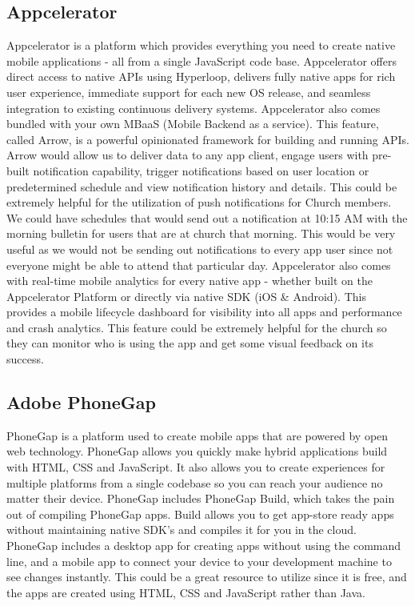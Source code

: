 \documentclass[letterpaper,10pt,draftclsnofoot,onecolumn,titlepage]{IEEEtran}
\begin{document}
		\subsection{Appcelerator}
			Appcelerator is a platform which provides everything you need to create native mobile applications - all from a single JavaScript code base. \cite{Appcelerator}
			Appcelerator offers direct access to native APIs using Hyperloop, delivers fully native apps for rich user experience, immediate support for each new OS release, and seamless integration to existing continuous delivery systems.
			Appcelerator also comes bundled with your own MBaaS (Mobile Backend as a service).
			This feature, called Arrow, is a powerful opinionated framework for building and running APIs.
			Arrow would allow us to deliver data to any app client, engage users with pre-built notification capability, trigger notifications based on user location or predetermined schedule and view notification history and details.
			This could be extremely helpful for the utilization of push notifications for Church members.
			We could have schedules that would send out a notification at 10:15 AM with the morning bulletin for users that are at church that morning.
			This would be very useful as we would not be sending out notifications to every app user since not everyone might be able to attend that particular day.
			Appcelerator also comes with real-time mobile analytics for every native app - whether built on the Appcelerator Platform or directly via native SDK (iOS \& Android).
			This provides a mobile lifecycle dashboard for visibility into all apps and performance and crash analytics.
			This feature could be extremely helpful for the church so they can monitor who is using the app and get some visual feedback on its success.

		\subsection{Adobe PhoneGap}
			PhoneGap is a platform used to create mobile apps that are powered by open web technology. \cite{PhoneGap}
			PhoneGap allows you quickly make hybrid applications build with HTML, CSS and JavaScript.
			It also allows you to create experiences for multiple platforms from a single codebase so you can reach your audience no matter their device.
			PhoneGap includes PhoneGap Build, which takes the pain out of compiling PhoneGap apps.
			Build allows you to get app-store ready apps without maintaining native SDK's and compiles it for you in the cloud.
			PhoneGap includes a desktop app for creating apps without using the command line, and a mobile app to connect your device to your development machine to see changes instantly.
			This could be a great resource to utilize since it is free, and the apps are created using HTML, CSS and JavaScript rather than Java.
\end{document}

